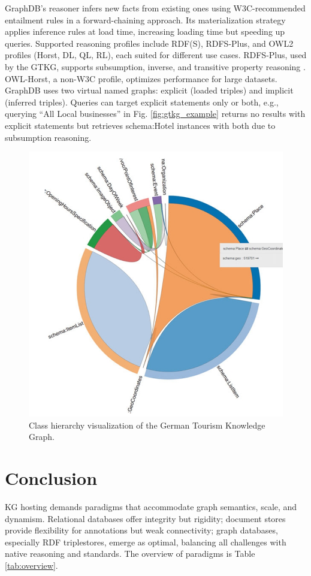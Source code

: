 \documentclass[12pt]{article}
\begin{document}
GraphDB’s reasoner infers new facts from existing ones using W3C-recommended entailment rules in a forward-chaining approach. Its materialization strategy applies inference rules at load time, increasing loading time but speeding up queries. Supported reasoning profiles include RDF(S), RDFS-Plus, and OWL2 profiles (Horst, DL, QL, RL), each suited for different use cases. RDFS-Plus, used by the GTKG, supports subsumption, inverse, and transitive property reasoning \cite{10.1145/3382097}. OWL-Horst, a non-W3C profile, optimizes performance for large datasets. GraphDB uses two virtual named graphs: explicit (loaded triples) and implicit (inferred triples). Queries can target explicit statements only or both, e.g., querying “All Local businesses” in Fig. \ref{fig:gtkg_example} returns no results with explicit statements but retrieves schema:Hotel instances with both due to subsumption reasoning.

\begin{figure}
    \includegraphics[width=\linewidth]{imgs/19.9.jpeg}
    \caption{Class hierarchy visualization of the German Tourism Knowledge Graph.}
    \label{fig:class-hierarchy-example1}
\end{figure}
\section{Conclusion}
KG hosting demands paradigms that accommodate graph semantics, scale, and dynamism. Relational databases offer integrity but rigidity; document stores provide flexibility for annotations but weak connectivity; graph databases, especially RDF triplestores, emerge as optimal, balancing all challenges with native reasoning and standards. The overview of paradigms is Table \ref{tab:overview}.
\end{document}
